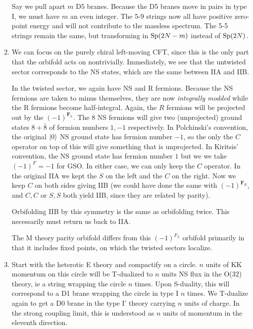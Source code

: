 \documentclass[11pt, class=article, crop=false]{standalone}
\begin{document}
\begin{enumerate}
	Say we pull apart $m$ D5 branes. Because the D5 branes move in pairs in type I, we must have $m$ an even integer. The 5-9 strings now all have positive zero-point energy and will not contribute to the massless spectrum. The 5-5 strings remain the same, but transforming in $\mathrm{Sp}(2N - m)$ instead of $\mathrm{Sp}(2N)$.
 	
	
	\item We can focus on the purely chiral left-moving CFT, since this is the only part that the orbifold acts on nontrivially. Immediately, we see that the untwisted sector corresponds to the NS states, which are the same between IIA and IIB. 
	
	In the twisted sector, we again have NS and R fermions. Because the NS fermions are taken to minus themselves, they are now \emph{integrally modded} while the R fermions become half-integral. Again, the $R$ fermions will be projected out by the $(-1)^{\mathbf{F}_L}$. The $8$ NS fermions will give two (unprojected) ground states $8 + \bar 8$ of fermion numbers $1, -1$ respectively. In Polchinski's convention, the original $\ket{0}$ NS ground state has fermion number $-1$, so the only the $C$ operator on top of this will give something that is unprojected. In Kiritsis' convention, the NS ground state has fermion number $1$ but we we take $(-1)^F = -1$ for GSO. In either case, we can only keep the $C$ operator. In the original IIA we kept the $S$ on the left and the $C$ on the right. Now we keep $C$ on both sides giving IIB (we could have done the same with $(-1)^{\mathbf{F}_R}$, and $C,C$ or $S,S$ both yield IIB, since they are related by parity).
	
	Orbifolding IIB by this symmetry is the same as orbifolding twice. This necessarily must return us back to IIA. 
	
	The M theory parity orbifold differs from this $(-1)^{F_L}$ orbifold primarily in that it includes fixed points, on which the twisted sectors localize. 
	
	\item Start with the heterotic E theory and compactify on a circle. $n$ units of KK momentum on this circle will be T-dualized to $n$ units NS flux in the O(32) theory, ie a string wrapping the circle $n$ times. Upon S-duality, this will correspond to a D1 brane wrapping the circle in type I $n$ times. We T-dualize again to get a D0 brane in the type I' theory carrying $n$ units of charge. In the strong coupling limit, this is understood as $n$ units of momentum in the eleventh direction.  
	

\end{enumerate}
\end{document}

